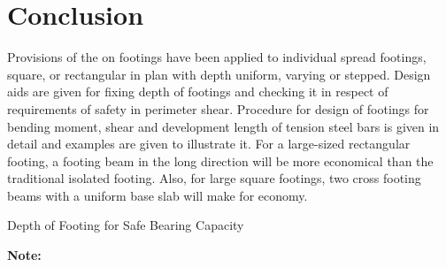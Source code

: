 \section{Conclusion}
Provisions of the   on footings have been applied to individual spread
footings, square, or rectangular in plan with depth uniform, varying or 
stepped. Design aids are given for  fixing depth of footings and checking
it in respect of requirements of safety in perimeter shear. Procedure for
design of footings for bending moment, shear and development length of 
tension steel bars is given in detail and examples are given to illustrate it.
For a large-sized rectangular footing, a footing beam in the long direction 
will be more economical than the traditional isolated footing. Also, for
large square footings, two cross footing beams with a uniform base slab
will make for economy.

\begin{table}[h!]\centering
        \caption{Depth of Footing for Safe Bearing Capacity}
        \label{chaptertable}
\end{table}

\textbf{Note:}
\printbibliography
